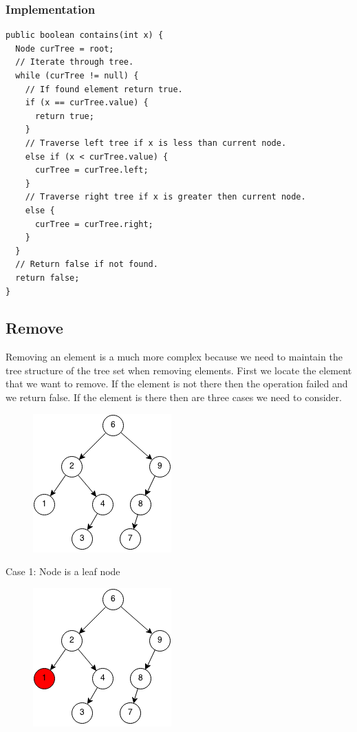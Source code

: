 \documentclass[11pt,oneside]{book}
\makeatletter
\def\maxwidth#1{\ifdim\Gin@nat@width>#1 #1\else\Gin@nat@width\fi}
\makeatother
\begin{document}
\subsubsection{Implementation}

\begin{lstlisting}
public boolean contains(int x) {
  Node curTree = root;
  // Iterate through tree.
  while (curTree != null) {
    // If found element return true.
    if (x == curTree.value) {
      return true;
    }
    // Traverse left tree if x is less than current node.
    else if (x < curTree.value) {
      curTree = curTree.left;
    }
    // Traverse right tree if x is greater then current node.
    else {
      curTree = curTree.right;
    }
  }
  // Return false if not found.
  return false;
}
\end{lstlisting}

\subsection{Remove}

Removing an element is a much more complex because we need to maintain the tree structure of the tree set when removing elements. First we locate the element that we want to remove. If the element is not there then the operation failed and we return false. If the element is there then are three cases we need to consider.

\vspace{5px}\begin{figure}[H]\centering
        \includegraphics[width=0.66\maxwidth{\textwidth}]{bst-rem.png}
        \end{figure}

Case 1: Node is a leaf node

\vspace{5px}\begin{figure}[H]\centering
        \includegraphics[width=0.66\maxwidth{\textwidth}]{bst-rem-case11.png}
        \end{figure}
\end{document}
